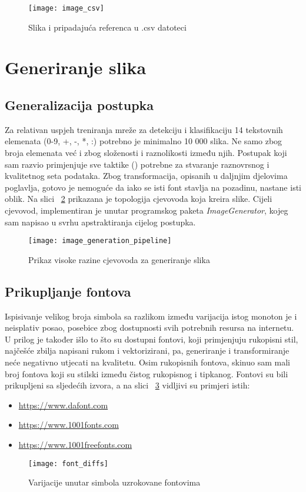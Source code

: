 \begin{figure}[h!]
	\centering
	\texttt{[image: image\_csv]}
	 \caption{Slika i pripadajuća referenca u .csv datoteci}
 	 \label{fig:pipelineExitExample}
\end{figure}

\section{Generiranje slika}
\subsection{Generalizacija postupka}
Za relativan uspjeh treniranja mreže za detekciju i klasifikaciju 14 tekstovnih elemenata (0-9, +, -, *, :) potrebno je minimalno 10 000 slika. Ne samo zbog broja elemenata već i zbog složenosti i raznolikosti između njih. 
Postupak koji sam razvio primjenjuje sve taktike (\cite{chollet2017deep}) potrebne za stvaranje raznovrsnog i kvalitetnog seta podataka.
Zbog transformacija, opisanih u daljnjim djelovima poglavlja, gotovo je nemoguće da iako se isti font stavlja na pozadinu, nastane isti oblik.
Na slici ~\ref{fig:imageGenerationPipeline} prikazana je topologija cjevovoda koja kreira slike.
Cijeli cjevovod, implementiran je unutar programskog paketa \emph{ImageGenerator}, kojeg sam napisao u svrhu apstraktiranja cijelog postupka.
\begin{figure}[h!]
	\centering
	\texttt{[image: image\_generation\_pipeline]}
	 \caption{Prikaz visoke razine cjevovoda za generiranje slika}
 	 \label{fig:imageGenerationPipeline}
\end{figure}

\subsection{Prikupljanje fontova}
Ispisivanje velikog broja simbola sa razlikom između varijacija istog monoton je i neisplativ posao, posebice zbog dostupnosti svih potrebnih resursa na internetu.
U prilog je također išlo to što su dostupni fontovi, koji primjenjuju rukopisni stil, najčešće zbilja napisani rukom i vektorizirani, pa, generiranje i transformiranje neće negativno utjecati na kvalitetu.
Osim rukopisnih fontova, skinuo sam mali broj fontova koji su stilski između čistog rukopisnog i tipkanog.
Fontovi su bili prikupljeni sa sljedećih izvora, a na slici ~\ref{fig:fontDiffs} vidljivi su primjeri istih:
\begin{itemize}
\item \url{https://www.dafont.com}
\item \url{https://www.1001fonts.com}
\item \url{https://www.1001freefonts.com}
\end{itemize}
\begin{figure}[h!]
	\centering
	\texttt{[image: font\_diffs]}
	 \caption{Varijacije unutar simbola uzrokovane fontovima}
 	 \label{fig:fontDiffs}
\end{figure}

